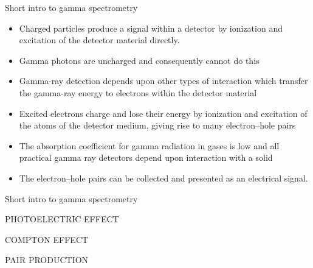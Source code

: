 \begin{frame}{Short intro to gamma spectrometry}


\begin{exampleblock}{}

{\small
\begin{itemize}
\item Charged particles produce a signal within a detector by ionization and excitation of the detector material directly. 
\item Gamma photons are uncharged and consequently cannot do this 
\item Gamma-ray detection depends upon other types of interaction which transfer the gamma-ray energy to electrons within the detector material 
\item Excited electrons charge and lose their energy by ionization and excitation of the atoms of the detector medium, giving rise to many electron–hole pairs 
\item The absorption coefficient for gamma radiation in gases is low and all practical gamma ray detectors depend upon interaction with a solid 
\item The electron–hole pairs can be collected and presented as an electrical signal.
\end{itemize}
}
\end{exampleblock}

\end{frame}

\begin{frame}{Short intro to gamma spectrometry}


\pause
\begin{block}{}
\centering PHOTOELECTRIC EFFECT
\end{block}

\pause
\begin{block}{}
\centering COMPTON EFFECT
\end{block}

\pause
\begin{block}{}
\centering PAIR PRODUCTION
\end{block}

\end{frame}


